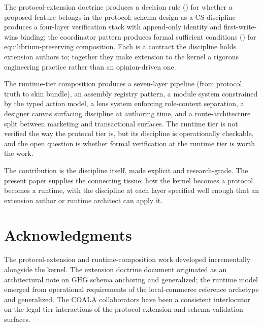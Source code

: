 \documentclass[11pt,a4paper]{article}
\theoremstyle{definition}
\theoremstyle{remark}
\begin{document}
The protocol-extension doctrine produces a decision rule
() for whether a proposed feature belongs
in the protocol; schema design as a CS discipline produces a
four-layer verification stack with append-only identity and
first-write-wins binding; the coordinator pattern produces formal
sufficient conditions () for
equilibrium-preserving composition. Each is a contract the
discipline holds extension authors to; together they make extension
to the kernel a rigorous engineering practice rather than an
opinion-driven one.

The runtime-tier composition produces a seven-layer pipeline (from
protocol truth to skin bundle), an assembly registry pattern, a
module system constrained by the typed action model, a lens system
enforcing role-context separation, a designer canvas surfacing
discipline at authoring time, and a route-architecture split between
marketing and transactional surfaces. The runtime tier is not
verified the way the protocol tier is, but its discipline is
operationally checkable, and the open question is whether formal
verification at the runtime tier is worth the work.

The contribution is the discipline itself, made explicit and
research-grade. The present paper supplies the connecting tissue:
how the kernel becomes a protocol becomes a runtime, with the
discipline at each layer specified well enough that an extension
author or runtime architect can apply it.

\section*{Acknowledgments}
The protocol-extension and runtime-composition work developed
incrementally alongside the kernel. The extension doctrine document
originated as an architectural note on GHG schema anchoring and
generalized; the runtime model emerged from operational requirements
of the local-commerce reference archetype and generalized. The COALA
collaborators have been a consistent interlocutor on the legal-tier
interactions of the protocol-extension and schema-validation surfaces.
\end{document}
